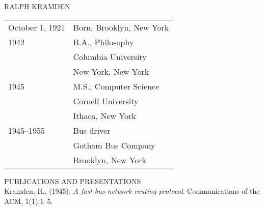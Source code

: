 \begin{center}
RALPH KRAMDEN \\[4ex]
\end{center}

\noindent
\begin{tabular}{ll}
October 1, 1921 & Born, Brooklyn, New York \\[2ex]

1942 \hspace{2in} & B.A., Philosophy \\
	        & Columbia University \\
		& New York, New York \\[2ex]
              
1945            & M.S., Computer Science \\
                & Cornell University \\
		& Ithaca, New York \\[2ex]

1945--1955      & Bus driver \\
		& Gotham Bus Company \\
		& Brooklyn, New York \\[3ex]
\end{tabular}

\noindent
PUBLICATIONS AND PRESENTATIONS \\[2ex]

\noindent
Kramden, R., (1945). {\em A fast bus network routing protocol}.
Communications of the ACM, 1(1):1--5. \\[2ex]

